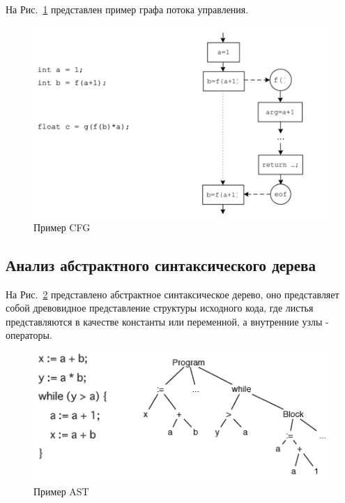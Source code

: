 На Рис.~\ref{fig:cfg_example_1} представлен пример графа потока управления.

\begin{figure}[htbp]
\centering
\includegraphics[width=\textwidth]{fig/cfg_example_1.png}
\caption{Пример CFG}%
\label{fig:cfg_example_1}
\end{figure}

\subsection{Анализ абстрактного синтаксического дерева}

На Рис.~\ref{fig:ast_example_1} представлено абстрактное синтаксическое дерево, оно представляет собой древовидное представление структуры исходного кода, где листья представляются в качестве константы или переменной, а внутренние узлы - операторы.

\begin{figure}[htbp]
\centering
\includegraphics[width=\textwidth]{fig/ast_example_1.png}
\caption{Пример AST}%
\label{fig:ast_example_1}
\end{figure}

